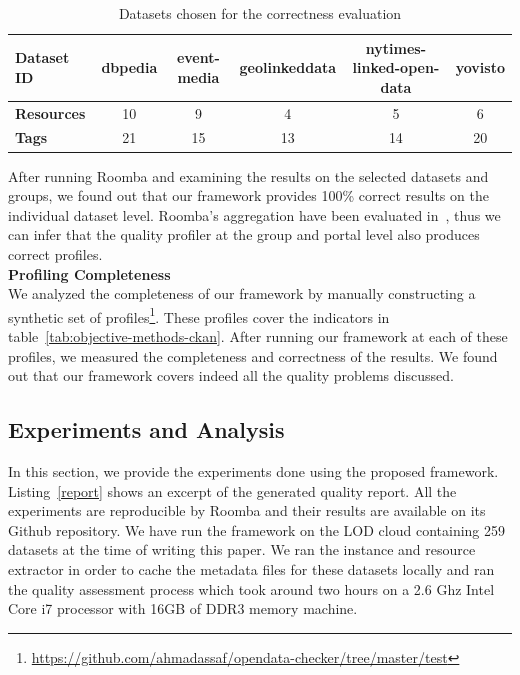 \documentclass[onecolumn, crcready]{../../Util/LaTEX/iosart2c}
\begin{document}
\begin{table}[ht]
\centering
\begin{tabular}{|l|c|c|c|c|c|}
\hline
\textbf{Dataset ID} & dbpedia & event-media & geolinkeddata & nytimes-linked-open-data & yovisto \\ \hline
\textbf{Resources}  & 10      & 9           & 4             & 5                        & 6       \\ \hline
\textbf{Tags}       & 21      & 15          & 13            & 14                       & 20      \\ \hline
\end{tabular}
\caption{Datasets chosen for the correctness evaluation}
\label{tab:datases_experiment}
\end{table}

After running Roomba and examining the results on the selected datasets and groups, we found out that our framework provides 100\% correct results on the individual dataset level. Roomba's aggregation have been evaluated in~\cite{Assaf:ESWC:PROFILES:15}, thus we can infer that the quality profiler at the group and portal level also produces correct profiles.\\

\textbf{Profiling Completeness}\\

We analyzed the completeness of our framework by manually constructing a synthetic set of profiles\footnote{\url{https://github.com/ahmadassaf/opendata-checker/tree/master/test}}. These profiles cover the indicators in table~\ref{tab:objective-methods-ckan}. After running our framework at each of these profiles, we measured the completeness and correctness of the results. We found out that our framework covers indeed all the quality problems discussed.


\subsection{Experiments and Analysis}
In this section, we provide the experiments done using the proposed framework. Listing~\ref{report} shows an excerpt of the generated quality report. All the experiments are reproducible by Roomba and their results are available on its Github repository. We have run the framework on the LOD cloud containing 259 datasets at the time of writing this paper. We ran the instance and resource extractor in order to cache the metadata files for these datasets locally and ran the quality assessment process which took around two hours on a 2.6 Ghz Intel Core i7 processor with 16GB of DDR3 memory machine.
\end{document}
